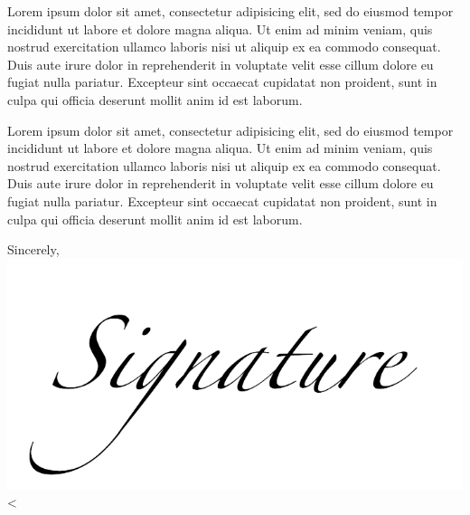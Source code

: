\documentclass[12pt,a4paper]{letter}
\renewcommand*{\closing}[1]{#1}
\begin{document}
\begin{letter}
Lorem ipsum dolor sit amet, consectetur adipisicing elit, sed do eiusmod
tempor incididunt ut labore et dolore magna aliqua. Ut enim ad minim veniam,
quis nostrud exercitation ullamco laboris nisi ut aliquip ex ea commodo
consequat. Duis aute irure dolor in reprehenderit in voluptate velit esse
cillum dolore eu fugiat nulla pariatur. Excepteur sint occaecat cupidatat non
proident, sunt in culpa qui officia deserunt mollit anim id est laborum.

Lorem ipsum dolor sit amet, consectetur adipisicing elit, sed do eiusmod
tempor incididunt ut labore et dolore magna aliqua. Ut enim ad minim veniam,
quis nostrud exercitation ullamco laboris nisi ut aliquip ex ea commodo
consequat. Duis aute irure dolor in reprehenderit in voluptate velit esse
cillum dolore eu fugiat nulla pariatur. Excepteur sint occaecat cupidatat non
proident, sunt in culpa qui officia deserunt mollit anim id est laborum.

\closing{
\vspace{0.5cm}
Sincerely, \\
\vspace{0.5cm}
\includegraphics[scale=0.35]{sample-signature}\\
<%
}

\end{letter}
\end{document}
